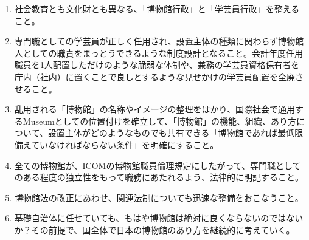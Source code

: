\documentclass[12pt]{jsarticle}
\begin{document}
\begin{enumerate}
\item 社会教育とも文化財とも異なる、「博物館行政」と「学芸員行政」を整えること。
\item 専門職としての学芸員が正しく任用され、設置主体の種類に関わらず博物館人としての職責をまっとうできるような制度設計となること。会計年度任用職員を1人配置しただけのような脆弱な体制や、兼務の学芸員資格保有者を庁内（社内）に置くことで良しとするような見せかけの学芸員配置を全廃させること。
\item 乱用される「博物館」の名称やイメージの整理をはかり、国際社会で通用するMuseumとしての位置付けを確立して、「博物館」の機能、組織、あり方について、設置主体がどのようなものでも共有できる「博物館であれば最低限備えていなければならない条件」を明確にすること。
\item 全ての博物館が、ICOMの博物館職員倫理規定にしたがって、専門職としてのある程度の独立性をもって職務にあたれるよう、法律的に明記すること。
\item 博物館法の改正にあわせ、関連法制についても迅速な整備をおこなうこと。
\item 基礎自治体に任せていても、もはや博物館は絶対に良くならないのではないか？その前提で、国全体で日本の博物館のあり方を継続的に考えていく。
\end{enumerate}

\end{document}
